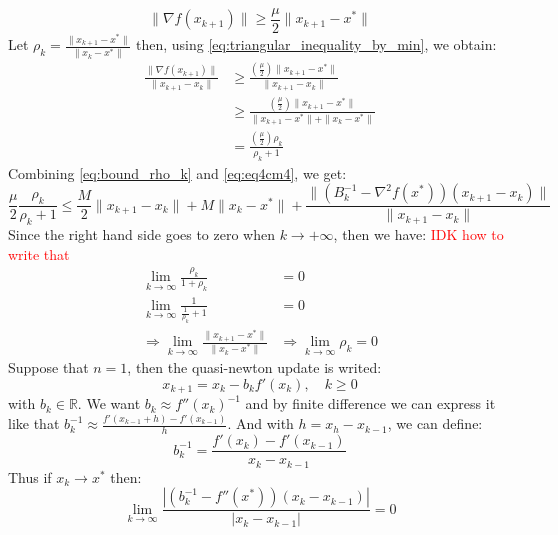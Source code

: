 \documentclass[12pt, openany]{report}
\newcommand{\R}{\mathbb{R}}
\theoremstyle{definition}
\begin{document}
\begin{equation}\label{eq:bound_norm_hessian}
	\|\nabla f(x_{k+1})\| \geq \frac{\mu}{2} \|x_{k+1}-x^*\|
\end{equation}
Let $\rho_k = \frac{\|x_{k+1}-x^*\|}{\|x_k-x^*\|}$ then, using \eqref{eq:triangular_inequality_by_min}, we obtain:
\begin{equation}\label{eq:bound_rho_k}
	\begin{aligned}
		\frac{\|\nabla f(x_{k+1})\|}{\|x_{k+1}-x_k\|} &\geq \frac{(\frac{\mu}{2})\|x_{k+1}-x^*\|}{\|x_{k+1}-x_k\|}\\
		&\geq \frac{(\frac{\mu}{2})\|x_{k+1}-x^*\|}{\|x_{k+1}-x^*\| + \|x_k-x^*\|}\\
		&= \frac{(\frac{\mu}{2}) \rho_k}{\rho_k + 1}
	\end{aligned}
\end{equation}
Combining \eqref{eq:bound_rho_k} and \eqref{eq:eq4cm4}, we get:
\begin{equation}
	\frac{\mu}{2} \frac{\rho_k}{\rho_k + 1} \leq \frac{M}{2} \|x_{k+1}-x_k\| + M \|x_k-x^*\| + \frac{\|\left(B^{-1}_k - \nabla^2f(x^*)\right) (x_{k+1}-x_k)\|}{\|x_{k+1}-x_k\|}
\end{equation}
Since the right hand side goes to zero when $k \to +\infty$, then we have:
\textcolor{red}{IDK how to write that}
\begin{equation}
	\begin{aligned}
		\lim_{k \to \infty} \frac{\rho_k}{1 + \rho_k} &= 0\\
		\lim_{k \to \infty} \frac{1}{\frac{1}{\rho_k} + 1} &= 0\\
		\Rightarrow \lim_{k \to \infty} \frac{\|x_{k+1}-x^*\|}{\|x_k-x^*\|} &\Rightarrow \lim_{k \to \infty} \rho_k = 0  
	\end{aligned}
\end{equation}
Suppose that $n=1$, then the quasi-newton update is writed:
\begin{equation}
	x_{k+1}=x_k-b_kf'(x_k), \quad k \geq 0
\end{equation}
with $b_k \in \R$. We want $b_k \approx f''(x_k)^{-1}$ and by finite difference we can express it like that $b_k^{-1} \approx \frac{f'(x_{k-1}+h)-f'(x_{k-1})}{h}$. And with $h = x_h-x_{k-1}$, we can define:
\begin{equation}\label{eq:def_b_k_1D}
	b_k^{-1} = \frac{f'(x_k)-f'(x_{k-1})}{x_{k}-x_{k-1}}
\end{equation}
Thus if $x_k \to x^*$ then:
\begin{equation}
	\lim_{k \to \infty} \frac{|(b_k^{-1}-f''(x^*))(x_k-x_{k-1})|}{|x_k-x_{k-1}|} = 0
\end{equation}
\end{document}
